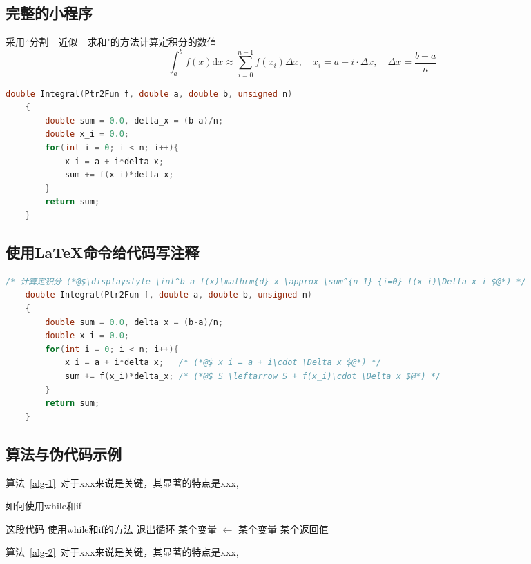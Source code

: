 \subsection{完整的小程序}
采用``分割---近似---求和"的方法计算定积分的数值
$$
\int^b_a f(x) \mathrm{d} x \approx \sum^{n-1}_{i=0} f(x_i)\Delta x, \quad x_i = a+i\cdot \Delta x, \quad \Delta x = \frac{b-a}{n}
$$
\begin{lstlisting}[language=C,frame=shadowbox,title={Integral-1.c}]
	double Integral(Ptr2Fun f, double a, double b, unsigned n)
	{
		double sum = 0.0, delta_x = (b-a)/n;
		double x_i = 0.0;
		for(int i = 0; i < n; i++){
			x_i = a + i*delta_x;
			sum += f(x_i)*delta_x;
		}
		return sum; 				
	}
\end{lstlisting}

\subsection{使用{\LaTeX{}}命令给代码写注释}

\begin{lstlisting}[language=C,frame=shadowbox,title={Integral-2.c}]
    /* 计算定积分 (*@$\displaystyle \int^b_a f(x)\mathrm{d} x \approx \sum^{n-1}_{i=0} f(x_i)\Delta x_i $@*) */
	double Integral(Ptr2Fun f, double a, double b, unsigned n)
	{
		double sum = 0.0, delta_x = (b-a)/n; 
		double x_i = 0.0;
		for(int i = 0; i < n; i++){
			x_i = a + i*delta_x;   /* (*@$ x_i = a + i\cdot \Delta x $@*) */
			sum += f(x_i)*delta_x; /* (*@$ S \leftarrow S + f(x_i)\cdot \Delta x $@*) */
		}
		return sum; 				
	}
\end{lstlisting}


\subsection{算法与伪代码示例}

算法~\ref{alg-1}~对于xxx来说是关键，其显著的特点是xxx, 

\begin{algorithm}[h]
	\caption{如何使用while和if} \label{alg-1}
	\begin{algorithmic}[1]  %
		\Require 这段代码
		\Ensure 使用while和if的方法
		\State 退出循环
		\EndIf
		\State 某个变量  $\gets$ 某个变量
		\EndWhile
		\State\Return 某个返回值
		\EndFunction
	\end{algorithmic}
\end{algorithm}

算法~\ref{alg-2}~对于xxx来说是关键，其显著的特点是xxx, 

